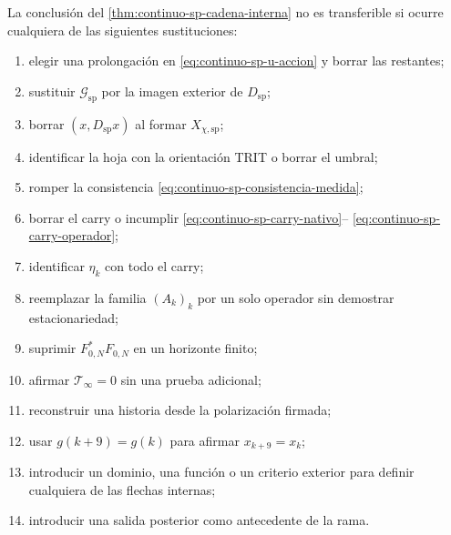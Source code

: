 \begin{proposition}
\label{prop:continuo-sp-falsadores}
La conclusión del
\cref{thm:continuo-sp-cadena-interna} no es transferible si ocurre cualquiera
de las siguientes sustituciones:
\begin{enumerate}
 \item elegir una prolongación en
       \eqref{eq:continuo-sp-u-accion} y borrar las restantes;
 \item sustituir \(\mathcal G_{\mathrm{sp}}\) por la imagen exterior de
       \(D_{\mathrm{sp}}\);
 \item borrar \((x,D_{\mathrm{sp}}x)\) al formar
       \(X_{\chi,\mathrm{sp}}\);
 \item identificar la hoja con la orientación TRIT o borrar el umbral;
 \item romper la consistencia
       \eqref{eq:continuo-sp-consistencia-medida};
 \item borrar el carry o incumplir
       \eqref{eq:continuo-sp-carry-nativo}--
       \eqref{eq:continuo-sp-carry-operador};
 \item identificar \(\eta_k\) con todo el carry;
 \item reemplazar la familia \((A_k)_k\) por un solo operador sin demostrar
       estacionariedad;
 \item suprimir \(F_{0,N}^*F_{0,N}\) en un horizonte finito;
 \item afirmar \(\mathcal T_\infty=0\) sin una prueba adicional;
 \item reconstruir una historia desde la polarización firmada;
 \item usar \(g(k+9)=g(k)\) para afirmar \(x_{k+9}=x_k\);
 \item introducir un dominio, una función o un criterio exterior para
       definir cualquiera de las flechas internas;
 \item introducir una salida posterior como antecedente de la rama.
\end{enumerate}
\end{proposition}
\fi
